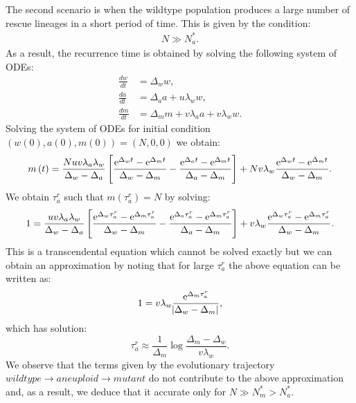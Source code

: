 \documentclass[12pt]{extarticle}
\newcommand{\e}{{\rm e}}
\begin{document}
\begin{appendices}
The second scenario is when the wildtype population produces a large number of rescue lineages in a short period of time. This is given by the condition:
\begin{align*}
N\gg N_a^*.
\end{align*}
As a result, the recurrence time is obtained by solving the following system of ODEs:
\begin{equation}\label{detODE}
\begin{aligned}
\frac{dw}{dt}&=\Delta_ww,\\
\frac{da}{dt}&=\Delta_aa+u\lambda_ww,\\
\frac{dm}{dt}&=\Delta_mm+v\lambda_aa+v\lambda_ww.
\end{aligned}
\end{equation}
Solving the system of ODEs for initial condition $\left(w(0), a(0), m(0)\right)=\left(N,0,0\right)$ we obtain:
\begin{align*}
m\left(t\right)=\frac{Nuv\lambda_a\lambda_w}{\Delta_w-\Delta_a}\left[\frac{\e^{\Delta_wt}-\e^{\Delta_mt}}{\Delta_w-\Delta_m}-\frac{\e^{\Delta_at}-\e^{\Delta_mt}}{\Delta_a-\Delta_m}\right]+Nv\lambda_w\frac{\e^{\Delta_wt}-\e^{\Delta_mt}}{\Delta_w-\Delta_m}.
\end{align*}
We obtain $\tau_a^r$ such that $m\left(\tau_a^r\right)=N$ by solving:
\begin{equation}%
1=\frac{uv\lambda_a\lambda_w}{\Delta_w-\Delta_a}\left[\frac{\e^{\Delta_w\tau_a^r}-\e^{\Delta_m\tau_a^r}}{\Delta_w-\Delta_m}-\frac{\e^{\Delta_a\tau_a^r}-\e^{\Delta_m\tau_a^r}}{\Delta_a-\Delta_m}\right]+v\lambda_w\frac{\e^{\Delta_w\tau_a^r}-\e^{\Delta_m\tau_a^r}}{\Delta_w-\Delta_m}.
\end{equation}
This is a transcendental equation which cannot be solved exactly but we can obtain an approximation by noting that for large $\tau_a^r$ the above equation can be written as: 
\begin{equation*}
1=v\lambda_w\frac{\e^{\Delta_m\tau_a^r}}{\abs{\Delta_w-\Delta_m}},
\end{equation*}
which has solution:
\begin{equation}\label{eq:t2det}
\tau_a^r\approx\frac{1}{\Delta_m}\log\frac{\Delta_m-\Delta_w}{v\lambda_w}.
\end{equation}
We observe that the terms given by the evolutionary trajectory $wildtype \rightarrow aneuploid \rightarrow mutant$ do not contribute to the above approximation and, as a result, we deduce that it accurate only for $N\gg N_m^*>N_a^*$.


\end{appendices}
\end{document}
